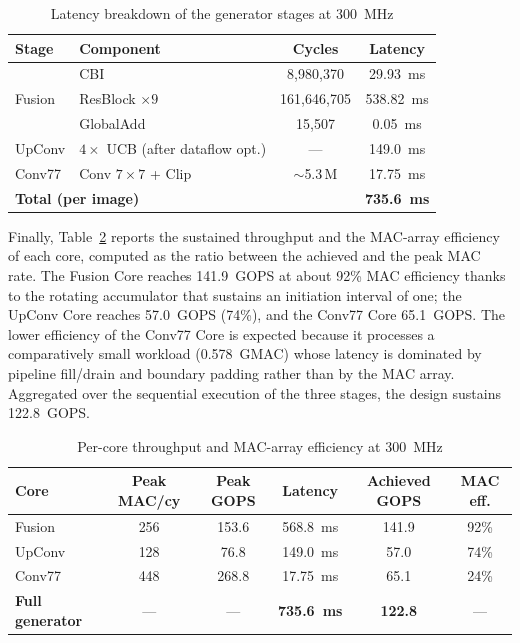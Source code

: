 \begin{table}[H]
    \centering
    \caption{Latency breakdown of the generator stages at 300~MHz}
    \label{tab:latency_breakdown}
    \small
    \renewcommand{\arraystretch}{1.2}
    \begin{tabular}{|l|l|c|c|}
        \hline
        \textbf{Stage} & \textbf{Component} & \textbf{Cycles} & \textbf{Latency} \\
        \hline
        \multirow{3}{*}{Fusion} & CBI & 8,980,370 & 29.93~ms \\
        \cline{2-4}
         & ResBlock $\times 9$ & 161,646,705 & 538.82~ms \\
        \cline{2-4}
         & GlobalAdd & 15,507 & 0.05~ms \\
        \hline
        UpConv & $4\times$ UCB (after dataflow opt.) & --- & 149.0~ms \\
        \hline
        Conv77 & Conv $7\times7$ + Clip & $\sim$5.3\,M & 17.75~ms \\
        \hline
        \multicolumn{2}{|l|}{\textbf{Total (per image)}} & & \textbf{735.6~ms} \\
        \hline
    \end{tabular}
\end{table}

Finally, Table~\ref{tab:throughput_breakdown} reports the sustained throughput and the MAC-array efficiency of each core, computed as the ratio between the achieved and the peak MAC rate. The Fusion Core reaches 141.9~GOPS at about 92\% MAC efficiency thanks to the rotating accumulator that sustains an initiation interval of one; the UpConv Core reaches 57.0~GOPS (74\%), and the Conv77 Core 65.1~GOPS. The lower efficiency of the Conv77 Core is expected because it processes a comparatively small workload (0.578~GMAC) whose latency is dominated by pipeline fill/drain and boundary padding rather than by the MAC array. Aggregated over the sequential execution of the three stages, the design sustains 122.8~GOPS.

\begin{table}[H]
    \centering
    \caption{Per-core throughput and MAC-array efficiency at 300~MHz}
    \label{tab:throughput_breakdown}
    \small
    \renewcommand{\arraystretch}{1.2}
    \begin{tabular}{|l|c|c|c|c|c|}
        \hline
        \textbf{Core} & \textbf{Peak MAC/cy} & \textbf{Peak GOPS} & \textbf{Latency} & \textbf{Achieved GOPS} & \textbf{MAC eff.} \\
        \hline
        Fusion & 256 & 153.6 & 568.8~ms & 141.9 & 92\% \\
        \hline
        UpConv & 128 & 76.8 & 149.0~ms & 57.0 & 74\% \\
        \hline
        Conv77 & 448 & 268.8 & 17.75~ms & 65.1 & 24\% \\
        \hline
        \textbf{Full generator} & --- & --- & \textbf{735.6~ms} & \textbf{122.8} & --- \\
        \hline
    \end{tabular}
\end{table}

